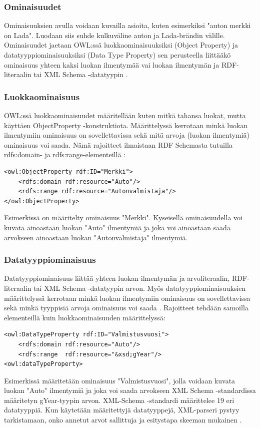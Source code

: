 \documentclass[finnish]{tktltiki2}
\theoremstyle{definition}
\theoremstyle{remark}
\begin{document}
\subsubsection{Ominaisuudet}
Ominaisuuksien avulla voidaan kuvailla asioita, kuten esimerkiksi "auton merkki on Lada". Luodaan siis suhde kulkuväline auton ja Lada-brändin välille. Ominaisuudet jaetaan OWL:ssä luokkaominaisuuksiksi (Object Property) ja datatyyppiominaisuuksiksi (Data Type Property) sen perusteella liittääkö ominaisuus yhteen kaksi luokan ilmentymää vai luokan ilmentymän ja RDF-literaalin tai XML Schema -datatyypin \cite{SWM04}.  

\subsubsection{Luokkaominaisuus}

OWL:ssä luokkaominaisuudet määritellään kuten mitkä tahansa luokat, mutta käyttäen ObjectProperty -konstruktiota. Määrittelyssä kerrotaan minkä luokan ilmentymiin ominaisuus on sovellettavissa sekä mitä arvoja (luokan ilmentymiä) ominaisuus voi saada. Nämä rajoitteet ilmaistaan RDF Schemasta tutuilla rdfs:domain- ja rdfs:range-elementeillä \cite{SWM04}:
\begin{verbatim}
<owl:ObjectProperty rdf:ID="Merkki">
    <rdfs:domain rdf:resource="Auto"/>
    <rdfs:range rdf:resource="Autonvalmistaja"/>
</owl:ObjectProperty>
\end{verbatim}
Esimerkissä on määritelty ominaisuus "Merkki". Kyseisellä ominaisuudella voi kuvata ainoastaan luokan "Auto" ilmentymiä ja joka voi ainoastaan saada arvokseen ainoastaan luokan "Autonvalmistaja" ilmentymiä. 

\subsubsection{Datatyyppiominaisuus}
Datatyyppiominaisuus liittää yhteen luokan ilmentymän ja arvoliteraalin, RDF-literaalin tai XML Schema -datatyypin arvon. Myös datatyyppiominaisuuksien määrittelyssä kerrotaan minkä luokan ilmentymiin ominaisuus on sovellettavissa sekä minkä tyyppisiä arvoja ominaisuus voi saada \cite{SWM04}. Rajoitteet tehdään samoilla elementeillä kuin luokkaominaisuuden määrittelyssä:
\begin{verbatim}
<owl:DataTypeProperty rdf:ID="Valmistusvuosi">
    <rdfs:domain rdf:resource="Auto"/>
    <rdfs:range  rdf:resource="&xsd;gYear"/>   
<owl:dataTypeProperty>
\end{verbatim}
Esimerkissä määritetään ominaisuus "Valmistusvuosi", jolla voidaan kuvata luokan "Auto" ilmentymiä ja joka voi saada arvokseen XML Schema -standardissa määritetyn gYear-tyypin arvon. XML-Schema -standardi määrittelee 19 eri datatyyppiä. Kun käytetään määritettyjä datatyyppejä, XML-parseri pystyy tarkistamaan, onko annetut arvot sallittuja ja esitystapa skeeman mukainen \cite{XMLS}.  
\end{document}
